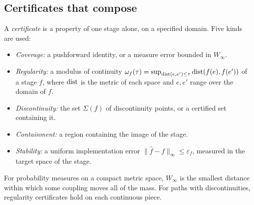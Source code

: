 \subsection{Certificates that compose}
\label{sec:cms-composition}

A \emph{certificate} is a property of one stage alone, on a specified domain. Five kinds are used:
\begin{itemize}
  \item \emph{Coverage:} a pushforward identity, or a measure error bounded in $W_\infty$.
  \item \emph{Regularity:} a modulus of continuity $\omega_f(\tau)=\sup_{\operatorname{dist}(e,e')\leq\tau}\operatorname{dist}(f(e),f(e'))$ of a stage $f$, where $\operatorname{dist}$ is the metric of each space and $e,e'$ range over the domain of $f$.
  \item \emph{Discontinuity:} the set $\Sigma(f)$ of discontinuity points, or a certified set containing it.
  \item \emph{Containment:} a region containing the image of the stage.
  \item \emph{Stability:} a uniform implementation error $\|\hat f-f\|_\infty\leq\varepsilon_f$, measured in the target space of the stage.
\end{itemize}
For probability measures on a compact metric space, $W_\infty$ \cite{champion2008infinity} is the smallest distance within which some coupling moves all of the mass. For paths with discontinuities, regularity certificates hold on each continuous piece.

